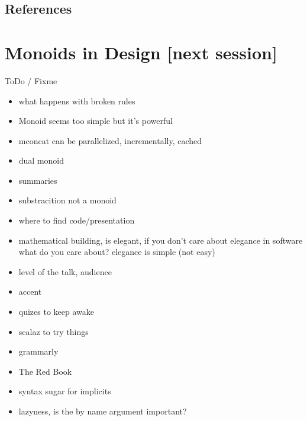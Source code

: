 \documentclass{beamer}
\begin{document}
\subsection{References}

\section{Monoids in Design \color[rgb]{0.5,0.1,0.9}[next session]}









\begin{frame}{ToDo / Fixme}
  \begin{itemize}
    \item what happens with broken rules
    \item Monoid seems too simple but it's powerful
    \item mconcat can be parallelized, incrementally, cached
    \item dual monoid
    \item summaries
      \item substracition not a monoid
      \item where to find code/presentation
        \item mathematical building, is elegant, if you don't care about
          elegance in software what do you care about? elegance is simple (not easy)
    \item level of the talk, audience
    \item accent
    \item quizes to keep awake
      \item scalaz to try things
        \item grammarly
          \item The Red Book
            \item syntax sugar for implicits
              \item lazyness, is the by name argument important?
  \end{itemize}
\end{frame}
\end{document}
